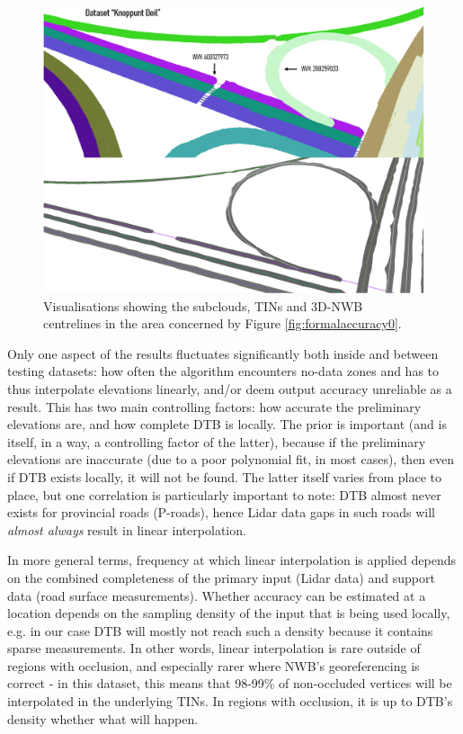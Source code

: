 \begin{figure}
    \centering
    \includegraphics[width=0.9\linewidth]{final_report/figs/formalaccuracy1.png}
    \caption{Visualisations showing the subclouds, TINs and 3D-NWB centrelines in the area concerned by Figure \ref{fig:formalaccuracy0}.}
    \label{fig:formalaccuracy1}
\end{figure}

Only one aspect of the results fluctuates significantly both inside and between testing datasets: how often the algorithm encounters no-data zones and has to thus interpolate elevations linearly, and/or deem output accuracy unreliable as a result. This has two main controlling factors: how accurate the preliminary elevations are, and how complete DTB is locally. The prior is important (and is itself, in a way, a controlling factor of the latter), because if the preliminary elevations are inaccurate (due to a poor polynomial fit, in most cases), then even if DTB exists locally, it will not be found. The latter itself varies from place to place, but one correlation is particularly important to note: DTB almost never exists for provincial roads (P-roads), hence Lidar data gaps in such roads will \textit{almost always} result in linear interpolation.

In more general terms, frequency at which linear interpolation is applied depends on the combined completeness of the primary input (Lidar data) and support data (road surface measurements). Whether accuracy can be estimated at a location depends on the sampling density of the input that is being used locally, e.g. in our case DTB will mostly not reach such a density because it contains sparse measurements. In other words, linear interpolation is rare outside of regions with occlusion, and especially rarer where NWB's georeferencing is correct - in this dataset, this means that 98-99\% of non-occluded vertices will be interpolated in the underlying TINs. In regions with occlusion, it is up to DTB's density whether what will happen.

